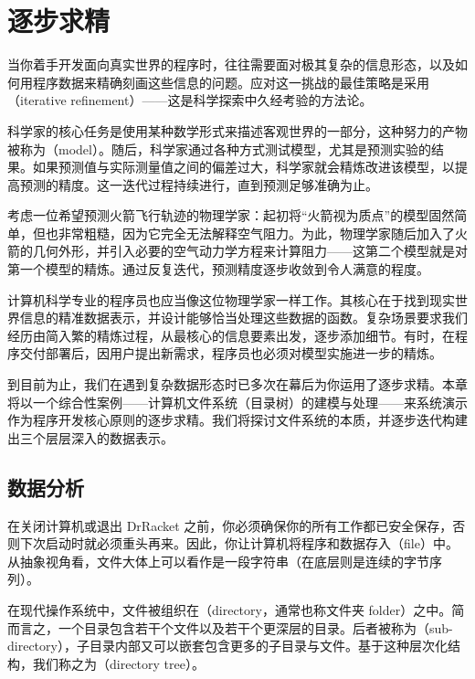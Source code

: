 
\chapter{逐步求精}
\label{sec:ch20_refinement}

当你着手开发面向真实世界的程序时，往往需要面对极其复杂的信息形态，以及如何用程序数据来精确刻画这些信息的问题。应对这一挑战的最佳策略是采用（iterative refinement）——这是科学探索中久经考验的方法论。

科学家的核心任务是使用某种数学形式来描述客观世界的一部分，这种努力的产物被称为（model）。随后，科学家通过各种方式测试模型，尤其是预测实验的结果。如果预测值与实际测量值之间的偏差过大，科学家就会精炼改进该模型，以提高预测的精度。这一迭代过程持续进行，直到预测足够准确为止。

考虑一位希望预测火箭飞行轨迹的物理学家：起初将“火箭视为质点”的模型固然简单，但也非常粗糙，因为它完全无法解释空气阻力。为此，物理学家随后加入了火箭的几何外形，并引入必要的空气动力学方程来计算阻力——这第二个模型就是对第一个模型的精炼。通过反复迭代，预测精度逐步收敛到令人满意的程度。

计算机科学专业的程序员也应当像这位物理学家一样工作。其核心在于找到现实世界信息的精准数据表示，并设计能够恰当处理这些数据的函数。复杂场景要求我们经历由简入繁的精炼过程，从最核心的信息要素出发，逐步添加细节。有时，在程序交付部署后，因用户提出新需求，程序员也必须对模型实施进一步的精炼。

到目前为止，我们在遇到复杂数据形态时已多次在幕后为你运用了逐步求精。本章将以一个综合性案例——计算机文件系统（目录树）的建模与处理——来系统演示作为程序开发核心原则的逐步求精。我们将探讨文件系统的本质，并逐步迭代构建出三个层层深入的数据表示。

\section{数据分析 }
\label{sec:20.1_data_analysis}

在关闭计算机或退出 DrRacket 之前，你必须确保你的所有工作都已安全保存，否则下次启动时就必须重头再来。因此，你让计算机将程序和数据存入（file）中。从抽象视角看，文件大体上可以看作是一段字符串（在底层则是连续的字节序列）。

在现代操作系统中，文件被组织在（directory，通常也称文件夹 folder）之中。简而言之，一个目录包含若干个文件以及若干个更深层的目录。后者被称为（sub-directory），子目录内部又可以嵌套包含更多的子目录与文件。基于这种层次化结构，我们称之为（directory tree）。

